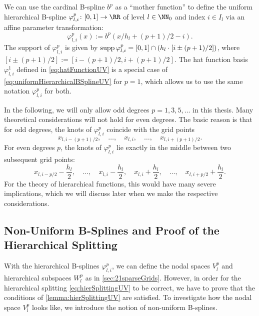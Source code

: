 We can use the cardinal B-spline $b^p$ as a ``mother function'' to
define the uniform hierarchical B-spline
$\varphi_{l,i}^p\colon [0, 1] \to \RR$ of level $l \in \NN_0$ and index
$i \in I_l$ via an affine parameter transformation:
\begin{equation}
  \label{eq:uniformHierarchicalBSplineUV}
  \varphi_{l,i}^p(x)
  := b^p(x/h_l + (p+1)/2 - i).
\end{equation}
The support of $\varphi_{l,i}^p$ is given
by $\operatorname{supp} \varphi_{l,i}^p = [0, 1] \cap (h_l \cdot [i \pm (p+1)/2])$,
where $[i \pm (p+1)/2] := [i - (p+1)/2, i + (p+1)/2]$.
The hat function basis $\varphi_{l,i}^1$ defined in
\eqref{eq:hatFunctionUV} is a special case of
\cref{eq:uniformHierarchicalBSplineUV} for $p = 1$,
which allows us to use the same notation $\varphi_{l,i}^p$ for both.

In the following, we will only allow odd degrees $p = 1, 3, 5, \dotsc$
in this thesis.
Many theoretical considerations will not hold for even degrees.
The basic reason is that for odd degrees, the knots of
$\varphi_{l,i}^p$ coincide with the grid points
\begin{equation}
  x_{l,i-(p+1)/2},\quad
  \dotsc,\quad
  x_{l,i},\quad
  \dotsc,\quad
  x_{l,i+(p+1)/2}.
\end{equation}
For even degrees $p$, the knots of $\varphi_{l,i}^p$ lie exactly in
the middle between two subsequent grid points:
\begin{equation}
  x_{l,i-p/2} - \frac{h_l}{2},\quad
  \dotsc,\quad
  x_{l,i} - \frac{h_l}{2},\quad
  x_{l,i} + \frac{h_l}{2},\quad
  \dotsc,\quad
  x_{l,i+p/2} + \frac{h_l}{2}.
\end{equation}
For the theory of hierarchical functions,
this would have many severe implications,
which we will discuss later
when we make the respective considerations.

\subsection{Non-Uniform B-Splines and Proof of the Hierarchical Splitting}

With the hierarchical B-splines $\varphi_{l,i}^p$, we can define
the nodal spaces $V_l^p$ and hierarchical subspaces $W_l^p$
as in \cref{sec:21sparseGrids}.
However, in order for the hierarchical splitting \eqref{eq:hierSplittingUV}
to be correct, we have to prove that the conditions of
\cref{lemma:hierSplittingUV} are satisfied.
To investigate how the nodal space $V_l^p$ looks like,
we introduce the notion of non-uniform B-splines.

